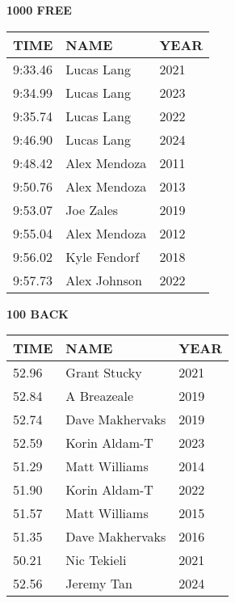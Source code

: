 \begin{minipage}[t]{0.48\textwidth}
\centering
\textbf{1000 FREE}\\[0.05cm]
\begin{tabular}{@{}p{1.8cm}p{2.8cm}p{1.2cm}@{}}
\hline
\textbf{TIME} & \textbf{NAME} & \textbf{YEAR} \\
\hline
9:33.46 & Lucas Lang & 2021 \\
9:34.99 & Lucas Lang & 2023 \\
9:35.74 & Lucas Lang & 2022 \\
9:46.90 & Lucas Lang & 2024 \\
9:48.42 & Alex Mendoza & 2011 \\
9:50.76 & Alex Mendoza & 2013 \\
9:53.07 & Joe Zales & 2019 \\
9:55.04 & Alex Mendoza & 2012 \\
9:56.02 & Kyle Fendorf & 2018 \\
9:57.73 & Alex Johnson & 2022 \\
\hline
\end{tabular}
\end{minipage}\hfill
\begin{minipage}[t]{0.48\textwidth}
\centering
\textbf{100 BACK}\\[0.05cm]
\begin{tabular}{@{}p{1.8cm}p{2.8cm}p{1.2cm}@{}}
\hline
\textbf{TIME} & \textbf{NAME} & \textbf{YEAR} \\
\hline
52.96 & Grant Stucky & 2021 \\
52.84 & A Breazeale & 2019 \\
52.74 & Dave Makhervaks & 2019 \\
52.59 & Korin Aldam-T & 2023 \\
51.29 & Matt Williams & 2014 \\
51.90 & Korin Aldam-T & 2022 \\
51.57 & Matt Williams & 2015 \\
51.35 & Dave Makhervaks & 2016 \\
50.21 & Nic Tekieli & 2021 \\
52.56 & Jeremy Tan & 2024 \\
\hline
\end{tabular}
\end{minipage}

\vspace{0.4cm}

